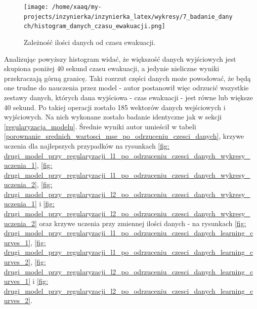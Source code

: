 \documentclass[12pt]{aghdpl}
\newenvironment{tightcenter}{
  \setlength\topsep{0pt}
  \setlength\parskip{0pt}
  \begin{center}
}{
  \end{center}
}
\begin{document}
		\begin{figure}[h]
			\begin{tightcenter}
		 		\texttt{[image: /home/xaaq/my-projects/inzynierka/inzynierka\_latex/wykresy/7\_badanie\_danych/histogram\_danych\_czasu\_ewakuacji.png]}
		 	\end{tightcenter}
		 	
		  	\caption{Zależność ilości danych od czasu ewakuacji.}
			\label{fig: zaleznosc_ilosci_danych_od_czasu_ewakuacji}
		\end{figure}
		
		Analizując powyższy histogram widać, że większość danych wyjściowych jest skupiona poniżej 40 sekund czasu ewakuacji, a jedynie nieliczne wyniki przekraczają górną granicę. Taki rozrzut części danych może powodować, że będą one trudne do nauczenia przez model - autor postanowił więc odrzucić wszystkie zestawy danych, których dana wyjściowa - czas ewakuacji - jest równe lub większe 40 sekund. Po takiej operacji zostało 185 wektorów danych wejściowych i wyjściowych. Na nich wykonane zostało badanie identyczne jak w sekcji \ref{regularyzacja_modelu}. Średnie wyniki autor umieścił w tabeli \ref{porownanie_srednich_wartosci_mse_po_odrzuceniu_czesci_danych}, krzywe uczenia dla najlepszych przypadków na rysunkach \ref{fig: drugi_model_przy_regularyzacji_l1_po_odrzuceniu_czesci_danych_wykresy_uczenia_1}, \ref{fig: drugi_model_przy_regularyzacji_l1_po_odrzuceniu_czesci_danych_wykresy_uczenia_2}, \ref{fig: drugi_model_przy_regularyzacji_l2_po_odrzuceniu_czesci_danych_wykresy_uczenia_1} i \ref{fig: drugi_model_przy_regularyzacji_l2_po_odrzuceniu_czesci_danych_wykresy_uczenia_2} oraz krzywe uczenia przy zmiennej ilości danych - na rysunkach \ref{fig: drugi_model_przy_regularyzacji_l1_po_odrzuceniu_czesci_danych_learning_curves_1}, \ref{fig: drugi_model_przy_regularyzacji_l1_po_odrzuceniu_czesci_danych_learning_curves_2}, \ref{fig: drugi_model_przy_regularyzacji_l2_po_odrzuceniu_czesci_danych_learning_curves_1} i \ref{fig: drugi_model_przy_regularyzacji_l2_po_odrzuceniu_czesci_danych_learning_curves_2}.
		
\end{document}
